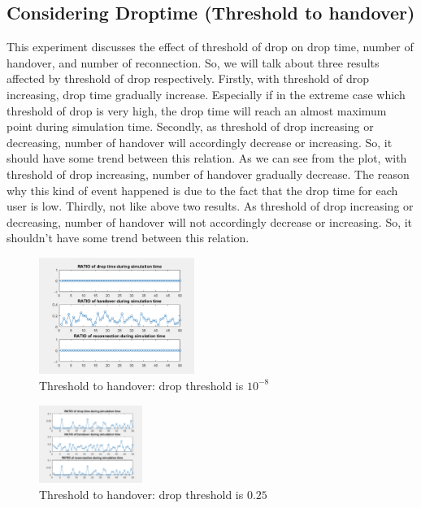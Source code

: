 \documentclass[a4paper]{IEEEtran}
\begin{document}
\subsection{Considering Droptime (Threshold to handover)}
This experiment discusses the effect of threshold of drop on drop time, number of handover, and number of reconnection. So, we will talk about three results affected by threshold of drop respectively. Firstly, with threshold of drop increasing, drop time gradually increase. Especially if in the extreme case which threshold of drop is very high, the drop time will reach an almost maximum point during simulation time. Secondly, as threshold of drop increasing or decreasing, number of handover will accordingly decrease or increasing. So, it should have some trend between this relation. As we can see from the plot, with threshold of drop increasing, number of handover gradually decrease. The reason why this kind of event happened is due to the fact that the drop time for each user is low.
Thirdly, not like above two results. As threshold of drop increasing or decreasing, number of handover will not accordingly decrease or increasing. So, it shouldn’t have some trend between this relation.

\begin{figure}[h]
    \includegraphics[width=0.45\textwidth]{exp1/1}
    \caption{Threshold to handover: drop threshold is $10^{-8}$}
    \label{fig:mesh12}
\end{figure}
\begin{figure}[h]
    \includegraphics[width=0.30\textwidth]{exp1/2}
    \caption{Threshold to handover: drop threshold is $0.25$}
    \label{fig:mesh13}
\end{figure}

\pagebreak
\end{document}
